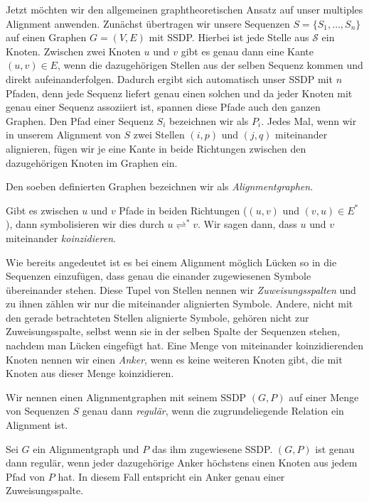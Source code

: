 Jetzt möchten wir den allgemeinen graphtheoretischen Ansatz auf unser multiples Alignment anwenden. Zunächst übertragen wir unsere Sequenzen $S = \{S_1, \dots, S_n\}$ auf einen Graphen $G=(V,E)$ mit SSDP. Hierbei ist jede Stelle aus $\mathcal{S}$ ein Knoten. Zwischen zwei Knoten $u$ und $v$ gibt es genau dann eine Kante $(u,v) \in E$, wenn die dazugehörigen Stellen aus der selben Sequenz kommen und direkt aufeinanderfolgen. Dadurch ergibt sich automatisch unser SSDP mit $n$ Pfaden, denn jede Sequenz liefert genau einen solchen und da jeder Knoten mit genau einer Sequenz assoziiert ist, spannen diese Pfade auch den ganzen Graphen. Den Pfad einer Sequenz $S_i$ bezeichnen wir als $P_i$. Jedes Mal, wenn wir in unserem Alignment von $S$ zwei Stellen $(i,p)$ und $(j,q)$ miteinander alignieren, fügen wir je eine Kante in beide Richtungen zwischen den dazugehörigen Knoten im Graphen ein.
	
\begin{definition}
	Den soeben definierten Graphen bezeichnen wir als \emph{Alignmentgraphen}.
\end{definition}

Gibt es zwischen $u$ und $v$ Pfade in beiden Richtungen ($(u,v)$ und $(v,u) \in E^*$), dann symbolisieren wir dies durch $u \rightleftharpoons^{*} v$. Wir sagen dann, dass $u$ und $v$ miteinander \emph{koinzidieren}. 

Wie bereits angedeutet ist es bei einem Alignment möglich Lücken so in die Sequenzen einzufügen, dass genau die einander zugewiesenen Symbole übereinander stehen. Diese Tupel von Stellen nennen wir \emph{Zuweisungsspalten} und zu ihnen zählen wir nur die miteinander alignierten Symbole. Andere, nicht mit den gerade betrachteten Stellen alignierte Symbole, gehören nicht zur Zuweisungsspalte, selbst wenn sie in der selben Spalte der Sequenzen stehen, nachdem man Lücken eingefügt hat. Eine Menge von miteinander koinzidierenden Knoten nennen wir einen \emph{Anker}, wenn es keine weiteren Knoten gibt, die mit Knoten aus dieser Menge koinzidieren.

\begin{definition}
	Wir nennen einen Alignmentgraphen mit seinem SSDP $(G,P)$ auf einer Menge von Sequenzen $S$ genau dann \emph{regulär}, wenn die zugrundeliegende Relation ein Alignment ist. 
\end{definition}

\begin{lemma}[{\cite{a97}}]
	Sei $G$ ein Alignmentgraph und $P$ das ihm zugewiesene SSDP. $(G,P)$ ist genau dann regulär, wenn jeder dazugehörige Anker höchstens einen Knoten aus jedem Pfad von $P$ hat. In diesem Fall entspricht ein Anker genau einer Zuweisungsspalte.
\end{lemma}

